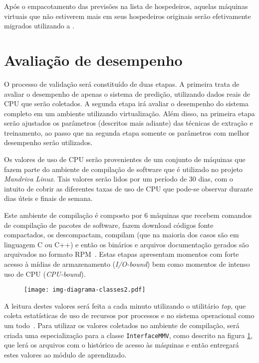 Após o empacotamento das previsões na lista de hospedeiros, aquelas
máquinas virtuais que não estiverem mais em seus hospedeiros originais
serão efetivamente migrados utilizando a \libvirt{}.

\section{Avaliação de desempenho}\label{sec:desemp}


O processo de validação será constituído de duas etapas. A primeira trata de
avaliar o desempenho de apenas o sistema de predição, utilizando dados reais de
CPU que serão coletados. A segunda etapa irá avaliar o desempenho do sistema
completo em um ambiente utilizando virtualização. Além disso, na primeira etapa
serão ajustados os parâmetros (descritos mais adiante) das técnicas de extração
e treinamento, ao passo que na segunda etapa somente os parâmetros com melhor
desempenho serão utilizados.

Os valores de uso de CPU serão provenientes de um conjunto de máquinas que
fazem parte do ambiente de compilação de software que é utilizado no projeto
\emph{Mandriva Linux}. Tais valores serão lidos por um período de 30 dias, com
o intuito de cobrir as diferentes taxas de uso de CPU que pode-se observar
durante dias úteis e finais de semana.

Este ambiente de compilação é composto por $6$ máquinas que recebem
comandos de compilação de pacotes de software, fazem download códigos fonte
compactados, os descompactam, compilam (que na maioria dos casos são em
linguagem C ou C++) e então os binários e arquivos documentação gerados são
arquivados no formato RPM~\cite{ewing1996rpm}. Estas etapas apresentam
momentos com forte acesso à mídias de armazenamento (\emph{I/O-bound}) bem
como momentos de intenso uso de CPU (\emph{CPU-bound}).

\begin{figure}[htp]
\centering
\texttt{[image: img-diagrama-classes2.pdf]}
\label{fig:diagramaclasses2}
\end{figure}

A leitura destes valores será feita a cada minuto utilizando o utilitário
\emph{top}, que coleta estatísticas de uso de recursos por processos e no
sistema operacional como um todo~\cite{andresen2004monitoring}. Para utilizar
os valores coletados no ambiente de compilação, será criada uma especialização
para a classe \texttt{InterfaceMMV}, como descrito na figura
\ref{fig:diagramaclasses2}, que lerá os arquivos com o histórico de acesso às
máquinas e então entregará estes valores ao módulo de aprendizado.

